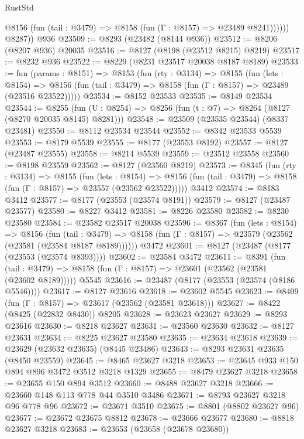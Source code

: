 \begin{lexlean}{RustStd}
\begin{coremodule}
              @8156 (fun (tail : @3479) => @8158 (fun (Γ : @8157) => @23489 @8241))))))
        @8287))
    @936
@23509 := @8293 (@23482 (@8144 @936))
@23512 := @8206 (@8207 @936) @20035
@23516 := @8127 (@8198 (@23512 @8215) @8219)
@23517 := @8232 @936
@23522 := @8229 (@8231 @23517 @20038 @8187 @8189)
@23533 := fun (params : @8151) =>
  @8153
    (fun (rty : @3134) =>
    @8155
      (fun (lets : @8154) =>
      @8156 (fun (tail : @3479) => @8158 (fun (Γ : @8157) => @23489 (@23516 @23522)))))
@23534 := @8152 @23533
@23535 := @8149 @23534
@23544 := @8255
    (fun (U : @8254) => @8256 (fun (t : @7) => @8264 (@8127 (@8270 @20035 @8145) @8281)))
@23548 := @23509 (@23535 @23544) (@8337 @23481)
@23550 := @8112 @23534 @23544
@23552 := @8342 @23533 @5539
@23553 := @8179 @5539
@23555 := @8177 (@23553 @8192)
@23557 := @8127 (@23487 @23555)
@23558 := @8214 @5539
@23559 := @23512 @23558
@23560 := @8198 @23559
@23562 := @8127 (@23560 @8219)
@23573 := @8345
    (fun (rty : @3134) =>
    @8155
      (fun (lets : @8154) =>
      @8156 (fun (tail : @3479) => @8158 (fun (Γ : @8157) => @23557 (@23562 @23522)))))
    @3412
@23574 := @8183 @3412
@23577 := @8177 (@23553 (@23574 @8191))
@23579 := @8127 (@23487 @23577)
@23580 := @8227 @3412
@23581 := @8226 @23580
@23582 := @8230 @23580
@23584 := @23582 @23517 @20038
@23596 := @8367
    (fun (lets : @8154) =>
    @8156
      (fun (tail : @3479) =>
      @8158 (fun (Γ : @8157) => @23579 (@23562 (@23581 (@23584 @8187 @8189))))))
    @3472
@23601 := @8127 (@23487 (@8177 (@23553 (@23574 @8393))))
@23602 := @23584 @3472
@23611 := @8391
    (fun (tail : @3479) => @8158 (fun (Γ : @8157) => @23601 (@23562 (@23581 (@23602 @8189)))))
    @5545
@23616 := @23487 (@8177 (@23553 (@23574 (@8186 @5546))))
@23617 := @8127 @23616
@23618 := @23602 @5545
@23623 := @8409 (fun (Γ : @8157) => @23617 (@23562 (@23581 @23618)))
@23627 := @8422 (@8425 (@22832 @8430)) @8205
@23628 := @23623 @23627
@23629 := @8293 @23616
@23630 := @8218 @23627
@23631 := @23560 @23630
@23632 := @8127 @23631
@23634 := @8225 @23627 @23580
@23635 := @23634 @23618
@23639 := @23629 (@23632 @23635) (@8445 @23486)
@23643 := @8293 @23631 @23635 (@8450 @23559)
@23645 := @8465 @23627 @3218
@23653 := @23645 @933 @150 @894 @896 @3472 @3512 @3218 @1329
@23655 := @8479 @23627 @3218
@23658 := @23655 @150 @894 @3512
@23660 := @8488 @23627 @3218
@23666 := @23660 @148 @113 @778 @44 @3510 @3486
@23671 := @8793 @23627 @3218 @96 @778 @96
@23672 := @23671 @3510
@23675 := @8801 (@8802 @23627 @96)
@23677 := @23672 @23675 @8812
@23678 := @23666 @23677
@23680 := @8818 @23627 @3218
@23683 := @23653 (@23658 (@23678 @23680))

\end{coremodule}
\end{lexlean}
